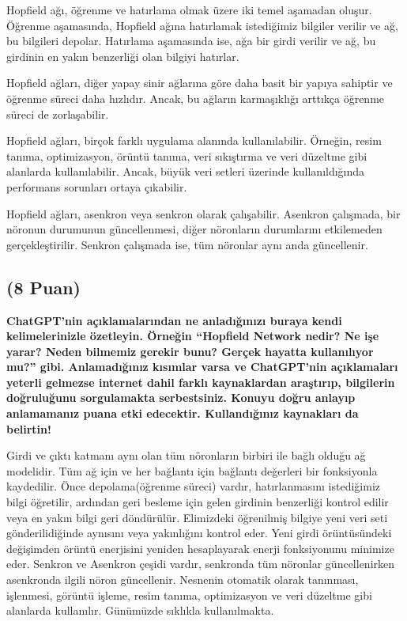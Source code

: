\documentclass[11pt]{article}
\begin{document}
Hopfield ağı, öğrenme ve hatırlama olmak üzere iki temel aşamadan oluşur. Öğrenme aşamasında, Hopfield ağına hatırlamak istediğimiz bilgiler verilir ve ağ, bu bilgileri depolar. Hatırlama aşamasında ise, ağa bir girdi verilir ve ağ, bu girdinin en yakın benzerliği olan bilgiyi hatırlar.

Hopfield ağları, diğer yapay sinir ağlarına göre daha basit bir yapıya sahiptir ve öğrenme süreci daha hızlıdır. Ancak, bu ağların karmaşıklığı arttıkça öğrenme süreci de zorlaşabilir.

Hopfield ağları, birçok farklı uygulama alanında kullanılabilir. Örneğin, resim tanıma, optimizasyon, örüntü tanıma, veri sıkıştırma ve veri düzeltme gibi alanlarda kullanılabilir. Ancak, büyük veri setleri üzerinde kullanıldığında performans sorunları ortaya çıkabilir.

Hopfield ağları, asenkron veya senkron olarak çalışabilir. Asenkron çalışmada, bir nöronun durumunun güncellenmesi, diğer nöronların durumlarını etkilemeden gerçekleştirilir. Senkron çalışmada ise, tüm nöronlar aynı anda güncellenir.

\subsection{(8 Puan)} \textbf{ChatGPT’nin açıklamalarından ne anladığınızı buraya kendi kelimelerinizle özetleyin. Örneğin ``Hopfield Network nedir? Ne işe yarar? Neden bilmemiz gerekir bunu? Gerçek hayatta kullanılıyor mu?'' gibi. Anlamadığınız kısımlar varsa ve ChatGPT’nin açıklamaları yeterli gelmezse internet dahil farklı kaynaklardan araştırıp, bilgilerin doğruluğunu sorgulamakta serbestsiniz. Konuyu doğru anlayıp anlamamanız puana etki edecektir. Kullandığınız kaynakları da belirtin!}

Girdi ve çıktı katmanı aynı olan tüm nöronların birbiri ile bağlı olduğu ağ modelidir. Tüm ağ için ve her bağlantı için bağlantı değerleri bir fonksiyonla kaydedilir. Önce depolama(öğrenme süreci) vardır, hatırlanmasını istediğimiz bilgi öğretilir, ardından geri besleme için gelen girdinin benzerliği kontrol edilir veya en yakın bilgi geri döndürülür. Elimizdeki öğrenilmiş bilgiye yeni veri seti gönderilidiğinde aynısını veya yakınlığını kontrol eder. Yeni girdi örüntüsündeki değişimden örüntü enerjisini yeniden hesaplayarak enerji fonksiyonunu minimize eder. Senkron ve Asenkron çeşidi vardır, senkronda tüm nöronlar güncellenirken asenkronda ilgili nöron güncellenir. Nesnenin otomatik olarak tanınması, işlenmesi, görüntü işleme, resim tanıma, optimizasyon ve veri düzeltme gibi alanlarda kullanılır. Günümüzde sıklıkla kullanılmakta.
\end{document}
